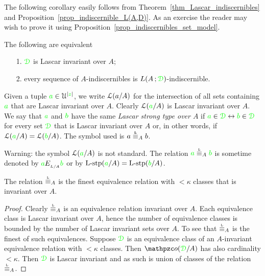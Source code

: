 \documentclass[creche.tex]{subfiles}
\begin{document}
The following corollary easily follows from Theorem~\ref{thm_Lascar_indiscernibles} and Proposition~\ref{prop_indiscernible_L(A,D)}. As an exercise the reader may wish to prove it using Proposition~\ref{prop_indiscernibles_set_model}.
 
\begin{corollary}
The following are equivalent
\begin{itemize}
\item[1.] ${\color{green}\EuScript D}$ is Lascar invariant over $A$;
\item[2.] every sequence of $A$-indiscernibles is $L(A\,;{\color{green}\EuScript D})$-indiscernible.\QED
\end{itemize}
\end{corollary}

Given a tuple ${\color{green} a}\in\EuScript U^{|{\color{green} z}|}$, we write \emph{$\EuScript L(a/A)$\/} for the intersection of all sets containing ${\color{green} a}$ that are Lascar invariant over $A$. Clearly $\EuScript L({\color{green} a}/A)$ is Lascar invariant over $A$. We say that ${\color{green} a}$ and ${\color{green} b}$ have the same \emph{Lascar strong type over $A$\/} if ${\color{green} a}\in{\color{green}\EuScript D}\leftrightarrow{\color{green}b}\in{\color{green}\EuScript D}$ for every set ${\color{green}\EuScript D}$ that is Lascar invariant over $A$ or, in other words, if $\EuScript L({\color{green} a}/A)=\EuScript L({\color{green} b}/A)$. The symbol used is \emph{$a\stackrel{\smash{\scalebox{.5}{\rm\bf L}}}{\equiv}_Ab$}.

\noindent\llap{\textcolor{red}{\Large\danger}\kern1.5ex}Warning: the symbol $\EuScript L({\color{green} a}/A)$ is not standard. The relation ${\gr a}\equivL_A{\gr b}$ is sometime denoted by ${\color{green} a}E_{_{L/A}}{\color{green} b}$ or by ${\rm L{\mbox{-}}stp}({\color{green} a}/A)={\rm L{\mbox{-}}stp}({\color{green} b}/A)$.


\begin{proposition}
  The relation $\equivL_A$ is the finest equivalence relation with $<\kappa$ classes that is invariant over $A$.\QED
\end{proposition}

\begin{proof}
  Clearly $\equivL_A$ is an equivalence relation invariant over $A$. Each equivalence class is Lascar invariant over $A$, hence the number of equivalence classes is bounded by the number of Lascar invariant sets over $A$. To see that $\equivL_A$ is the finest of such equivalences. Suppose ${\color{green}\EuScript D}$ is an equivalence class of an $A$-invariant equivalence relation with $<\kappa$ classes. Then $\oorbit(\grD/A)$ has also cardinality $<\kappa$. Then ${\color{green}\EuScript D}$ is Lascar invariant and as such is union of classes of the relation $\equivL_A$. 
\end{proof}
\end{document}

